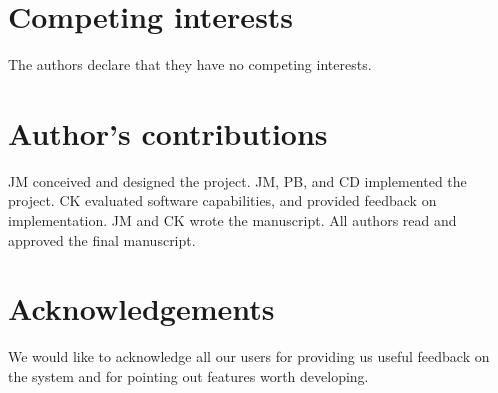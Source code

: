 \documentclass{bmcart}
\begin{document}
\begin{backmatter}

\section*{Competing interests}
The authors declare that they have no competing interests.

\section*{Author's contributions}
JM conceived and designed the project. JM, PB, and CD implemented the project. CK evaluated software capabilities, and provided 
feedback on implementation. JM and CK wrote the manuscript. All authors read and approved the final manuscript.

\section*{Acknowledgements}
We would like to acknowledge all our users for providing us useful feedback on
the system and for pointing out features worth developing.






\end{backmatter}
\end{document}
